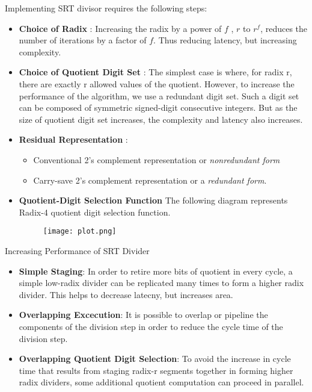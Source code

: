 \documentclass[10pt]{beamer}
\begin{document}
\begin{frame}
Implementing SRT divisor requires the following steps:
\begin{itemize}
\item \textbf{Choice of Radix} : Increasing the radix by a power of $f$ , $r$ to $r^f$, reduces the number of iterations by a factor of $f$. Thus reducing latency, but increasing complexity.
\item \textbf{Choice of Quotient Digit Set} : The  simplest  case  is  where,  for  radix  r,  there  are exactly  r  allowed  values  of  the  quotient.  However,  to  increase the performance of the algorithm, we use a redundant digit  set.  Such  a  digit  set  can  be  composed  of  symmetric signed-digit   consecutive   integers. But as the size of quotient digit set increases, the complexity and latency also increases.
\end{itemize}
\end{frame}
\begin{frame}
\begin{itemize}
\item \textbf{Residual Representation} : 
\begin{itemize}
\item Conventional  2's  complement  representation  or \textit{nonredundant form}
\item Carry-save  2's  complement  representation or a  \textit{redundant  form}.
\end{itemize}
\item \textbf{Quotient-Digit Selection Function}
The following diagram represents Radix-4 quotient digit selection function.
\begin{figure}
\texttt{[image: plot.png]}
\end{figure}
\end{itemize}
\end{frame}

\begin{frame}{Increasing Performance of SRT Divider}
\begin{itemize}
\item \textbf{Simple Staging}: In order to retire more bits of quotient in every cycle, a simple low-radix divider can be replicated many times to form a higher radix divider. This helps to decrease latecny, but increases area.
\item \textbf{Overlapping Excecution}: It is possible to overlap or pipeline the components of the division step in order to reduce the cycle time of the division step.
\item \textbf{Overlapping Quotient Digit Selection}: To avoid the increase in cycle time that results from staging radix-r segments together in forming higher radix dividers, some additional quotient computation can proceed in parallel.
\end{itemize}
\end{frame}
\end{document}

